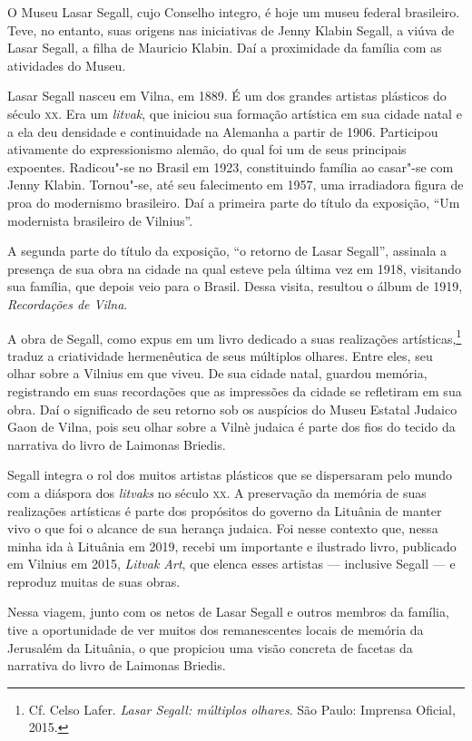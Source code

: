O Museu Lasar Segall, cujo Conselho integro, é hoje um museu federal
brasileiro. Teve, no entanto, suas origens nas iniciativas de Jenny
Klabin Segall, a viúva de Lasar Segall, a filha de Mauricio Klabin. Daí
a proximidade da família com as atividades do Museu.

Lasar Segall nasceu em Vilna, em 1889. É um dos grandes artistas
plásticos do século \textsc{xx}. Era um \emph{litvak}, que iniciou sua formação
artística em sua cidade natal e a ela deu densidade e continuidade na
Alemanha a partir de 1906. Participou ativamente do expressionismo
alemão, do qual foi um de seus principais expoentes. Radicou"-se no
Brasil em 1923, constituindo família ao casar"-se com Jenny Klabin.
Tornou"-se, até seu falecimento em 1957, uma irradiadora figura de proa
do modernismo brasileiro. Daí a primeira parte do título da exposição,
``Um modernista brasileiro de Vilnius''.

A segunda parte do título da exposição, ``o retorno de Lasar Segall'',
assinala a presença de sua obra na cidade na qual esteve pela última vez
em 1918, visitando sua família, que depois veio para o Brasil. Dessa
visita, resultou o álbum de 1919, \emph{Recordações de Vilna}.

A obra de Segall, como expus em um livro dedicado a suas realizações
artísticas,\footnote{Cf. Celso Lafer. \emph{Lasar Segall: múltiplos
  olhares}. São Paulo: Imprensa Oficial, 2015.} traduz a criatividade
hermenêutica de seus múltiplos olhares. Entre eles, seu olhar sobre a
Vilnius em que viveu. De sua cidade natal, guardou memória, registrando
em suas recordações que as impressões da cidade se refletiram em sua
obra. Daí o significado de seu retorno sob os auspícios do Museu Estatal
Judaico Gaon de Vilna, pois seu olhar sobre a Vilnè judaica é parte dos
fios do tecido da narrativa do livro de Laimonas Briedis.

Segall integra o rol dos muitos artistas plásticos que se dispersaram
pelo mundo com a diáspora dos \emph{litvaks} no século \textsc{xx}. A preservação
da memória de suas realizações artísticas é parte dos propósitos do
governo da Lituânia de manter vivo o que foi o alcance de sua herança
judaica. Foi nesse contexto que, nessa minha ida à Lituânia em 2019,
recebi um importante e ilustrado livro, publicado em Vilnius em 2015,
\emph{Litvak Art}, que elenca esses artistas --- inclusive Segall --- e
reproduz muitas de suas obras.

Nessa viagem, junto com os netos de Lasar Segall e outros membros da
família, tive a oportunidade de ver muitos dos remanescentes locais de
memória da Jerusalém da Lituânia, o que propiciou uma visão concreta de
facetas da narrativa do livro de Laimonas Briedis.

